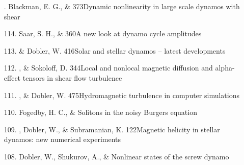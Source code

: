 \begin{itemize}
\item[\relevant 115.]
Blackman, E. G., \& \Brandenburg{}
{373}{Dynamic nonlinearity in large scale dynamos with shear}

\item[114.]
Saar, S. H., \& \Brandenburg{}
{360}{A new look at dynamo cycle amplitudes}

\item[113.]
\Brandenburg \& Dobler, W.
{416}{Solar and stellar dynamos -- latest developments}

\item[112.]
\Brandenburg, \& Sokoloff, D.
{344}{Local and nonlocal magnetic diffusion and alpha-effect
tensors in shear flow turbulence}

\item[111.]
\Brandenburg, \& Dobler, W.
{475}{Hydromagnetic turbulence in computer simulations}

\item[110.]
Fogedby, H. C., \& \Brandenburg{}
{Solitons in the noisy Burgers equation}

\item[109.]
\Brandenburg, Dobler, W., \& Subramanian, K.
{122}{Magnetic helicity in stellar dynamos: new numerical experiments}

\item[108.]
Dobler, W., Shukurov, A., \& \Brandenburg{}
{Nonlinear states of the screw dynamo}


\end{itemize}
